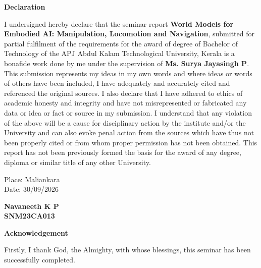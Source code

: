 \documentclass[12pt,a4paper,final]{extreport}
\begin{document}
\newpage

\thispagestyle{empty}
\begin{center}
\begin{huge}
\textbf{Declaration}
\end{huge}
\end{center}

\vskip0.5cm
I undersigned hereby declare that the seminar report \textbf{World Models for Embodied AI: Manipulation, Locomotion and Navigation}, submitted for partial fulfilment of the requirements for the award of degree of Bachelor of Technology of the APJ Abdul Kalam Technological University, Kerala is a bonafide work done by me under the supervision of \textbf{Ms. Surya Jayasingh P}. This submission represents my ideas in my own words and where ideas or words of others have been included, I have adequately and accurately cited and referenced the original sources. I also declare that I have adhered to ethics of academic honesty and integrity and have not misrepresented or fabricated any data or idea or fact or source in my submission. I understand that any violation of the above will be a cause for disciplinary action by the institute and/or the University and can also evoke penal action from the sources which have thus not been properly cited or from whom proper permission has not been obtained. This report has not been previously formed the basis for the award of any degree, diploma or similar title of any other University.

\vspace{2cm}
\noindent
\begin{minipage}[t]{0.5\textwidth}
Place: Maliankara\\
Date: 30/09/2026
\end{minipage}%
\hfill
\begin{minipage}[t]{0.4\textwidth}
\centering
\textbf{Navaneeth K P}\\
\textbf{SNM23CA013}
\end{minipage}

\newpage
\thispagestyle{plain}
\setcounter{page}{1}
\begin{center}
\begin{huge}
\textbf{Acknowledgement}
\end{huge}
\end{center}
\vskip1cm
\hspace*{1 cm} Firstly, I thank God, the Almighty, with whose blessings, this seminar has been successfully completed.
\end{document}
